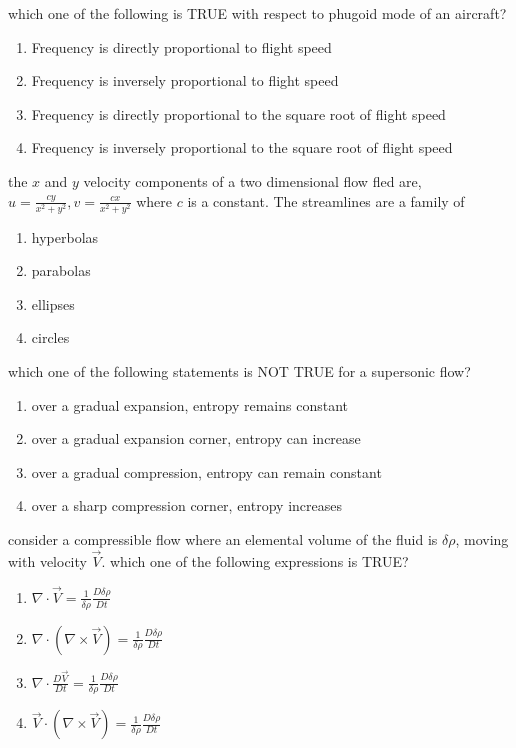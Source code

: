 \item which one of the following is TRUE with respect to phugoid mode of an aircraft?
\begin{enumerate}
    \item Frequency is directly proportional to flight speed
    \item Frequency is inversely proportional to flight speed
    \item Frequency is directly proportional to the square root of flight speed
    \item Frequency is inversely proportional to the square root of flight speed \\
\end{enumerate}

\item the $x$ and $y$ velocity components of a two dimensional flow fled are, $u=\frac{cy}{x^2+y^2},v=\frac{cx}{x^2+y^2}$ where $c$ is a constant. The streamlines are a family of 
\begin{enumerate}
    \item hyperbolas
    \item parabolas
    \item ellipses
    \item circles \\
\end{enumerate}

\item which one of the following statements is NOT TRUE for a supersonic flow?
\begin{enumerate}
   \item over a gradual expansion, entropy remains constant
    \item over a gradual expansion corner, entropy can increase
     \item over a gradual compression, entropy can remain constant
     \item over a sharp compression corner, entropy increases \\
\end{enumerate}

\item consider a compressible flow where an elemental volume of the fluid is $\delta \rho$, moving with velocity $\overrightarrow{V}$. which one of the following expressions is TRUE?
\begin{enumerate}
    \item $\nabla \cdot \overrightarrow{V}=\frac{1}{\delta \rho} \frac{D\delta \rho}{Dt}$
    \item $\nabla \cdot (\nabla \times \overrightarrow{V})=\frac{1}{\delta \rho} \frac{D\delta \rho}{Dt}$
    \item $\nabla \cdot \frac{D\overrightarrow{V}}{Dt}=\frac{1}{\delta \rho} \frac{D\delta \rho}{Dt}$
    \item $\overrightarrow{V} \cdot (\nabla \times \overrightarrow{V})=\frac{1}{\delta \rho} \frac{D\delta \rho}{Dt}$ \\
\end{enumerate}

